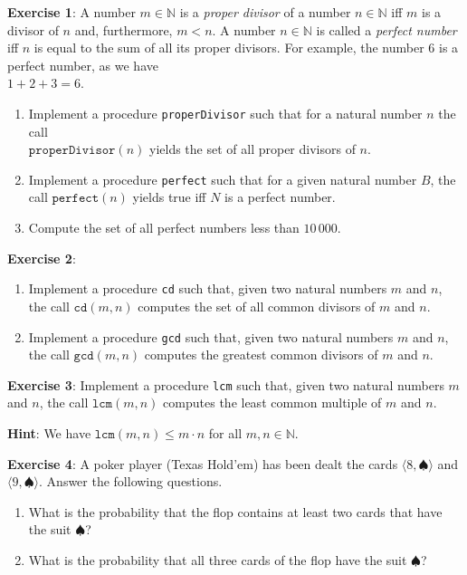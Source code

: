 \documentclass{article}
\newcommand{\spade}{\ensuremath{\spadesuit  }}
\def\pair(#1,#2){\langle #1, #2 \rangle}
\begin{document}
\noindent
\textbf{Exercise 1}: A number $m\in \mathbb{N}$ is a  \emph{proper divisor} of a number 
$n \in \mathbb{N}$ iff $m$ is a divisor of $n$ and, furthermore, $m < n$.
A number $n \in \mathbb{N}$ is called a \emph{perfect number} iff $n$ is equal to the sum of all
its proper divisors.  For example, the number $6$ is a perfect number, as we have
\\[0.2cm]
\hspace*{1.3cm}
 $1 + 2 + 3 = 6$.
\begin{enumerate}
\item Implement a procedure \texttt{properDivisor} such that for a natural number $n$ the call \\
      $\mathtt{properDivisor}(n)$ yields the set of all proper divisors of
      $n$.
\item Implement a procedure \texttt{perfect} such that for a given natural number $B$,
      the call $\mathtt{perfect}(n)$ yields true iff $N$ is a perfect number.
\item Compute the set of all perfect numbers less than $10\,000$.
\end{enumerate}
\vspace{0.3cm}

\noindent
\textbf{Exercise 2}:
\begin{enumerate}
\item Implement a procedure \texttt{cd} such that, given two natural numbers $m$ and $n$,
      the call $\mathtt{cd}(m,n)$ computes the set of all common divisors of 
      $m$ and $n$.
\item Implement a procedure \texttt{gcd} such that, given two natural numbers $m$ and $n$,
      the call $\mathtt{gcd}(m,n)$ computes the greatest common divisors of $m$ and $n$.       
\end{enumerate}
\vspace{0.3cm}

\noindent
\textbf{Exercise 3}:
Implement a procedure \texttt{lcm} such that, given two natural numbers $m$ and $n$, the call
$\mathtt{lcm}(m,n)$ computes the least common multiple of $m$ and $n$. 
 \vspace{0.2cm}

\noindent
\textbf{Hint}: We have $\texttt{lcm}(m,n) \leq m \cdot n$ for all $m,n \in \mathbb{N}$.
\vspace{0.3cm}

\noindent
\textbf{Exercise 4}: A poker player (Texas Hold'em) has been dealt the cards  
 $\pair(8,\spade)$ and $\pair(9,\spade)$.  Answer the following questions.
\begin{enumerate}
\item What is the probability that the flop contains at least two cards that have the
      suit $\spade$?
\item What is the probability that all three cards of the flop have the suit $\spade$?
\end{enumerate}
\vspace{0.3cm}
\end{document}
